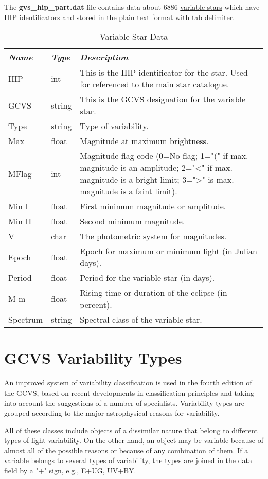 The \textbf{gvs\_hip\_part.dat} file contains data about 6886
\href{Variable_Stars}{variable stars} which have HIP identificators and
stored in the plain text format with tab delimiter.

\begin{longtabu} to \textwidth {l|l|X}
\caption{Variable Star Data}
\toprule
\emph{Name} & \emph{Type} & \emph{Description}\tabularnewline
\midrule
HIP & int & This is the HIP identificator for the star. Used for
referenced to the main star catalogue.\tabularnewline
GCVS & string & This is the GCVS designation for the variable
star.\tabularnewline
\midrule
Type & string & Type of variability.\tabularnewline
\midrule
Max & float & Magnitude at maximum brightness.\tabularnewline
\midrule
MFlag & int & Magnitude flag code (0=No flag; 1="(" if max. magnitude is
an amplitude; 2="\textless{}" if max. magnitude is a bright limit;
3="\textgreater{}" is max. magnitude is a faint limit).\tabularnewline
\midrule
Min I & float & First minimum magnitude or amplitude.\tabularnewline
\midrule
Min II & float & Second minimum magnitude.\tabularnewline
\midrule
V & char & The photometric system for magnitudes.\tabularnewline
\midrule
Epoch & float & Epoch for maximum or minimum light (in Julian
days).\tabularnewline
\midrule
Period & float & Period for the variable star (in days).\tabularnewline
\midrule
M-m & float & Rising time or duration of the eclipse (in
percent).\tabularnewline
\midrule
Spectrum & string & Spectral class of the variable star.\tabularnewline
\bottomrule
\end{longtabu}

\section{GCVS Variability Types}\label{gcvs-variability-types}

An improved system of variability classification is used in the fourth
edition of the GCVS, based on recent developments in classification
principles and taking into account the suggestions of a number of
specialists. Variability types are grouped according to the major
astrophysical reasons for variability.

All of these classes include objects of a dissimilar nature that belong
to different types of light variability. On the other hand, an object
may be variable because of almost all of the possible reasons or because
of any combination of them. If a variable belongs to several types of
variability, the types are joined in the data field by a "+" sign, e.g.,
E+UG, UV+BY.

